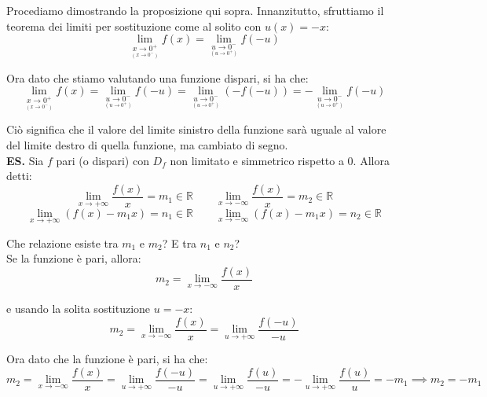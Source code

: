 \documentclass{article}
\begin{document}
\noindent Procediamo dimostrando la proposizione qui sopra. Innanzitutto, sfruttiamo il teorema dei limiti per sostituzione come al solito con $u(x) = -x$:
\begin{equation*}
    \lim_{\underset{\scriptstyle (x \to 0^-)}{x \to 0^+}} f(x) = \lim_{\underset{\scriptstyle (u \to 0^+)}{u \to 0^-}} f(-u)
\end{equation*}

\noindent Ora dato che stiamo valutando una funzione dispari, si ha che:
\begin{equation*}
    \lim_{\underset{\scriptstyle (x \to 0^-)}{x \to 0^+}} f(x) = \lim_{\underset{\scriptstyle (u \to 0^+)}{u \to 0^-}} f(-u) = \lim_{\underset{\scriptstyle (u \to 0^+)}{u \to 0^-}} (-f(-u)) = - \lim_{\underset{\scriptstyle (u \to 0^+)}{u \to 0^-}} f(-u)
\end{equation*}

\noindent Ciò significa che il valore del limite sinistro della funzione sarà uguale al valore del limite destro di quella funzione, ma cambiato di segno.\\

\noindent\textbf{ES.} Sia $f$ pari (o dispari) con $D_f$ non limitato e simmetrico rispetto a 0. Allora detti:
\begin{equation*}
    \lim_{x \to +\infty} \frac{f(x)}{x} = m_1 \in \mathbb{R} \qquad \lim_{x \to -\infty} \frac{f(x)}{x} = m_2 \in \mathbb{R}
\end{equation*}
\begin{equation*}
    \lim_{x \to +\infty} (f(x) - m_1x) = n_1 \in \mathbb{R} \qquad \lim_{x \to -\infty} (f(x) - m_1x) = n_2 \in \mathbb{R}
\end{equation*}

\noindent Che relazione esiste tra $m_1$ e $m_2$? E tra $n_1$ e $n_2$?\\
Se la funzione è pari, allora:
\begin{equation*}
    m_2 = \lim_{x \to -\infty} \frac{f(x)}{x}
\end{equation*}

\noindent e usando la solita sostituzione $u = -x$:
\begin{equation*}
    m_2 = \lim_{x \to -\infty} \frac{f(x)}{x} = \lim_{u \to +\infty} \frac{f(-u)}{-u}
\end{equation*}

\noindent Ora dato che la funzione è pari, si ha che:
\begin{equation*}
    m_2 = \lim_{x \to -\infty} \frac{f(x)}{x} = \lim_{u \to +\infty} \frac{f(-u)}{-u} = \lim_{u \to +\infty} \frac{f(u)}{-u} = -\lim_{u \to +\infty} \frac{f(u)}{u} = -m_1 \implies m_2 = -m_1
\end{equation*}
\end{document}
